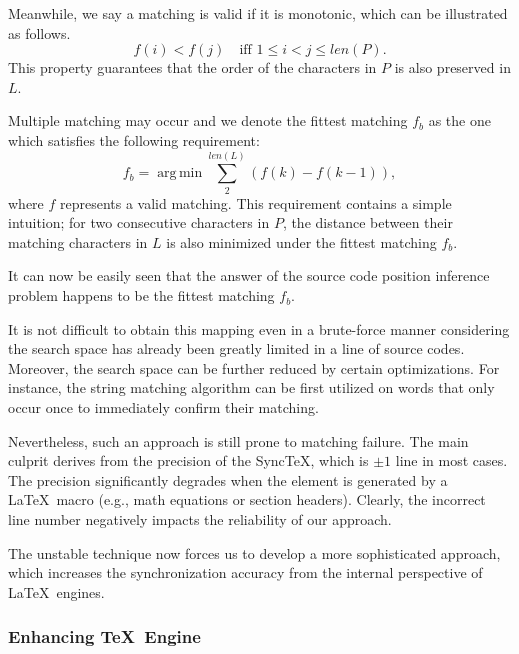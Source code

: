 \documentclass[sigconf]{acmart}
\DeclareMathOperator*{\argmin}{arg\,min}
\begin{document}
Meanwhile, we say a matching is valid if it is monotonic, which can be illustrated as follows.
\begin{equation}
f(i) < f(j)  \quad \text{iff } 1 \le i < j \le len(P).
\end{equation}
This property guarantees that the order of the characters in $P$ is also preserved in $L$.


Multiple matching may occur and we denote the fittest matching $f_b$ as the one which satisfies the following requirement:
\begin{equation}
f_b = \argmin \sum_{2}^{len(L)}(f(k) - f(k-1)),
\end{equation}
where $f$ represents a valid matching.
This requirement contains a simple intuition; for two consecutive characters in $P$, the distance between their matching characters in $L$ is also minimized under the fittest matching $f_b$. 


It can now be easily seen that the answer of the source code position inference problem happens to be the fittest matching $f_b$.

It is not difficult to obtain this mapping even in a brute-force manner considering the search space has already been greatly limited in a line of source codes.
Moreover, the search space can be further reduced by certain optimizations. For instance, the string matching algorithm can be first utilized on words that only occur once to immediately confirm their matching. 

Nevertheless, such an approach is still prone to matching failure. 
The main culprit derives from the precision of the Sync\TeX, which is $\pm 1$ line \cite{laurens2008direct} in most cases. 
The precision significantly degrades when the element is generated by a \LaTeX\ macro (e.g.,  math equations or section headers). 
Clearly, the incorrect line number negatively impacts the reliability of our approach.

The unstable technique now forces us to develop a more sophisticated approach, which increases the synchronization accuracy from the internal perspective of \LaTeX\ engines.

\subsubsection{Enhancing \TeX\ Engine}

\end{document}
